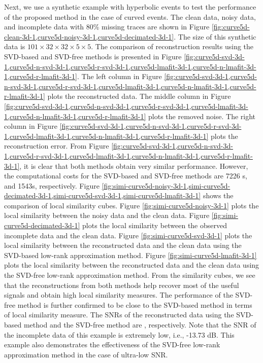 Next, we use a synthetic example with hyperbolic events to test the performance of the proposed method in the case of curved events. The clean data, noisy data, and incomplete data with 80\% missing traces are shown in Figure \ref{fig:curve5d-clean-3d-1,curve5d-noisy-3d-1,curve5d-decimated-3d-1}. The size of this synthetic data is $101\times32\times32\times5\times5$.  The comparison of reconstruction results using the SVD-based and SVD-free methods is presented in Figure \ref{fig:curve5d-svd-3d-1,curve5d-n-svd-3d-1,curve5d-r-svd-3d-1,curve5d-lmafit-3d-1,curve5d-n-lmafit-3d-1,curve5d-r-lmafit-3d-1}. The left column in Figure \ref{fig:curve5d-svd-3d-1,curve5d-n-svd-3d-1,curve5d-r-svd-3d-1,curve5d-lmafit-3d-1,curve5d-n-lmafit-3d-1,curve5d-r-lmafit-3d-1} plots the reconstructed data. The middle column in Figure \ref{fig:curve5d-svd-3d-1,curve5d-n-svd-3d-1,curve5d-r-svd-3d-1,curve5d-lmafit-3d-1,curve5d-n-lmafit-3d-1,curve5d-r-lmafit-3d-1} plots the removed noise. The right column in Figure \ref{fig:curve5d-svd-3d-1,curve5d-n-svd-3d-1,curve5d-r-svd-3d-1,curve5d-lmafit-3d-1,curve5d-n-lmafit-3d-1,curve5d-r-lmafit-3d-1} plots the reconstruction error. From Figure \ref{fig:curve5d-svd-3d-1,curve5d-n-svd-3d-1,curve5d-r-svd-3d-1,curve5d-lmafit-3d-1,curve5d-n-lmafit-3d-1,curve5d-r-lmafit-3d-1}, it is clear that both methods obtain very similar performance. However, the computational costs for the SVD-based and SVD-free methods are 7226 s, and 1543s, respectively. Figure \ref{fig:simi-curve5d-noisy-3d-1,simi-curve5d-decimated-3d-1,simi-curve5d-svd-3d-1,simi-curve5d-lmafit-3d-1}
shows the comparison of local similarity cubes. Figure \ref{fig:simi-curve5d-noisy-3d-1} plots the local similarity between the noisy data and the clean data. Figure \ref{fig:simi-curve5d-decimated-3d-1} plots the local similarity between the observed incomplete data and the clean data. Figure \ref{fig:simi-curve5d-svd-3d-1} plots the local similarity between the reconstructed data and the clean data using the SVD-based low-rank approximation method. Figure \ref{fig:simi-curve5d-lmafit-3d-1} plots the local similarity between the reconstructed data and the clean data using the SVD-free low-rank approximation method. From the similarity cubes, we see that the reconstructions from both methods help recover most of the useful signals and obtain high local similarity measures. The performance of the SVD-free method is further confirmed to be close to the SVD-based method in terms of local similarity measure. The SNRs of the reconstructed data using the SVD-based method and the SVD-free method are , respectively. Note that the SNR of the incomplete data of this example is extremely low, i.e., -13.73 dB. This example also demonstrates the effectiveness of the SVD-free low-rank approximation method in the case of ultra-low SNR. 

